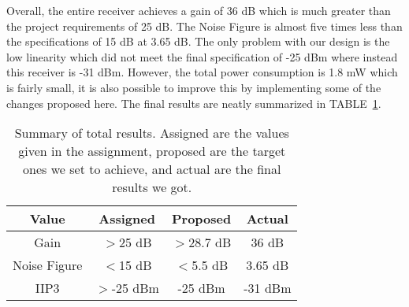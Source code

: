 Overall, the entire receiver achieves a gain of 36 dB which is much greater than the project requirements of 25 dB. The Noise Figure is almost five times less than the specifications of 15 dB  at 3.65 dB. The only problem with our design is the low linearity which did not meet the final specification of -25 dBm where instead this receiver is -31 dBm. However, the total power consumption is 1.8 mW which is fairly small, it is also possible to improve this by implementing some of the changes proposed here. The final results are neatly summarized in TABLE~\ref{tab:totalresults}.


\begin{table}[h]
\caption{Summary of total results. Assigned are the values given in the assignment, proposed are the target ones we set to achieve, and actual are the final results we got.}
\label{tab:totalresults}
\begin{center}
	\begin{tabular}{ c | c | c | c  }
		Value & Assigned & Proposed & Actual \\ \hline
		Gain & $>$25 dB & $>$28.7 dB & 36 dB \\ \hline
		Noise Figure & $<$15 dB & $<$5.5 dB & 3.65 dB \\ \hline
		IIP3 & $>$-25 dBm & -25 dBm & -31 dBm \\ 
	\end{tabular}

\end{center}

\end{table}
